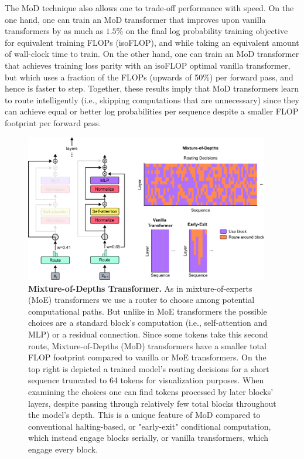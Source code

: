 \documentclass[11pt, a4paper, onecolumn, logo, copyright]{googledeepmind}
\begin{document}
The MoD technique also allows one to trade-off performance with speed. On the one hand, one can train an MoD transformer that improves upon vanilla transformers by as much as $1.5\%$ on the final log probability training objective for equivalent training FLOPs (isoFLOP), and while taking an equivalent amount of wall-clock time to train. On the other hand, one can train an MoD transformer that achieves training loss parity with an isoFLOP optimal vanilla transformer, but which uses a fraction of the FLOPs (upwards of 50\%) per forward pass, and hence is faster to step. Together, these results imply that MoD transformers learn to route intelligently (i.e., skipping computations that are unnecessary) since they can achieve equal or better log probabilities per sequence despite a smaller FLOP footprint per forward pass. 

\begin{figure}[h]
    \centering
    \includegraphics[width=0.95\textwidth]{mod.png}
    \caption{\textbf{Mixture-of-Depths Transformer.} As in mixture-of-experts (MoE) transformers we use a router to choose among potential computational paths. But unlike in MoE transformers the possible choices are a standard block's computation (i.e., self-attention and MLP) or a residual connection. Since some tokens take this second route, Mixture-of-Depths (MoD) transformers have a smaller total FLOP footprint compared to vanilla or MoE transformers. On the top right is depicted a trained model's routing decisions for a short sequence truncated to 64 tokens for visualization purposes. When examining the choices one can find tokens processed by later blocks' layers, despite passing through relatively few total blocks throughout the model's depth. This is a unique feature of MoD compared to conventional halting-based, or "early-exit" conditional computation, which instead engage blocks serially, or vanilla transformers, which engage every block.}
    \label{fig:mixture-of-depths}
\end{figure}
\end{document}
